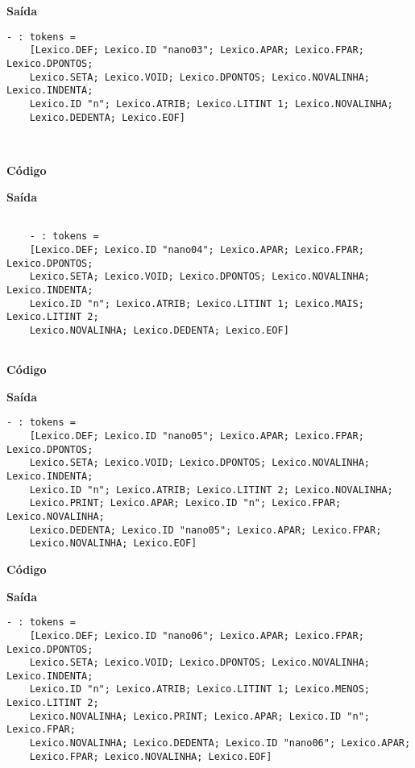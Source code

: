 \documentclass[hidelinks,12pt]{article}
\begin{document}
	{\large \textbf{Saída}}
	
	\begin{lstlisting}[caption=Analisador Léxico]
	- : tokens =
	[Lexico.DEF; Lexico.ID "nano03"; Lexico.APAR; Lexico.FPAR; Lexico.DPONTOS;
	Lexico.SETA; Lexico.VOID; Lexico.DPONTOS; Lexico.NOVALINHA; Lexico.INDENTA;
	Lexico.ID "n"; Lexico.ATRIB; Lexico.LITINT 1; Lexico.NOVALINHA;
	Lexico.DEDENTA; Lexico.EOF]
	
	
	\end{lstlisting}
	
	{\large \textbf{Código} }
			
	
	{\large \textbf{Saída}}
	
	\begin{lstlisting}[caption=Analisador Léxico]

	- : tokens =
	[Lexico.DEF; Lexico.ID "nano04"; Lexico.APAR; Lexico.FPAR; Lexico.DPONTOS;
	Lexico.SETA; Lexico.VOID; Lexico.DPONTOS; Lexico.NOVALINHA; Lexico.INDENTA;
	Lexico.ID "n"; Lexico.ATRIB; Lexico.LITINT 1; Lexico.MAIS; Lexico.LITINT 2;
	Lexico.NOVALINHA; Lexico.DEDENTA; Lexico.EOF]
	
	\end{lstlisting}
	
	{\large \textbf{Código} }
			
	
	{\large \textbf{Saída}}
	
	\begin{lstlisting}[caption=Analisador Léxico]
	- : tokens =
	[Lexico.DEF; Lexico.ID "nano05"; Lexico.APAR; Lexico.FPAR; Lexico.DPONTOS;
	Lexico.SETA; Lexico.VOID; Lexico.DPONTOS; Lexico.NOVALINHA; Lexico.INDENTA;
	Lexico.ID "n"; Lexico.ATRIB; Lexico.LITINT 2; Lexico.NOVALINHA;
	Lexico.PRINT; Lexico.APAR; Lexico.ID "n"; Lexico.FPAR; Lexico.NOVALINHA;
	Lexico.DEDENTA; Lexico.ID "nano05"; Lexico.APAR; Lexico.FPAR;
	Lexico.NOVALINHA; Lexico.EOF]
	\end{lstlisting}
	
	{\large \textbf{Código} }
			
	
	{\large \textbf{Saída}}
	
	\begin{lstlisting}[caption=Analisador Léxico]
	- : tokens =
	[Lexico.DEF; Lexico.ID "nano06"; Lexico.APAR; Lexico.FPAR; Lexico.DPONTOS;
	Lexico.SETA; Lexico.VOID; Lexico.DPONTOS; Lexico.NOVALINHA; Lexico.INDENTA;
	Lexico.ID "n"; Lexico.ATRIB; Lexico.LITINT 1; Lexico.MENOS; Lexico.LITINT 2;
	Lexico.NOVALINHA; Lexico.PRINT; Lexico.APAR; Lexico.ID "n"; Lexico.FPAR;
	Lexico.NOVALINHA; Lexico.DEDENTA; Lexico.ID "nano06"; Lexico.APAR;
	Lexico.FPAR; Lexico.NOVALINHA; Lexico.EOF]
	
	\end{lstlisting}
	
\end{document}
